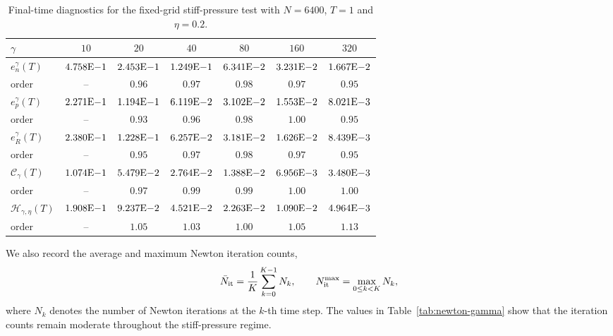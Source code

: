 \documentclass[11pt]{article}
\theoremstyle{plain}
\numberwithin{equation}{section}
\begin{document}
\begin{table}[!htbp]
\centering
\caption{Final-time diagnostics for the fixed-grid stiff-pressure test with
\(N=6400\), \(T=1\) and \(\eta=0.2\). }
\label{tab:stiff-diagnostics}
\begingroup
\small
\renewcommand{\arraystretch}{1.08}
\setlength{\tabcolsep}{5pt}
\begin{tabular}{lcccccc}
\toprule
\(\gamma\) & \(10\) & \(20\) & \(40\) & \(80\) & \(160\) & \(320\) \\
\midrule
\(e_n^\gamma(T)\)
& \(4.758{\rm E}{-1}\) & \(2.453{\rm E}{-1}\) & \(1.249{\rm E}{-1}\)
& \(6.341{\rm E}{-2}\) & \(3.231{\rm E}{-2}\) & \(1.667{\rm E}{-2}\) \\
 order
& -- & \(0.96\) & \(0.97\) & \(0.98\) & \(0.97\) & \(0.95\) \\
\hline
\(e_p^\gamma(T)\)
& \(2.271{\rm E}{-1}\) & \(1.194{\rm E}{-1}\) & \(6.119{\rm E}{-2}\)
& \(3.102{\rm E}{-2}\) & \(1.553{\rm E}{-2}\) & \(8.021{\rm E}{-3}\) \\
 order
& -- & \(0.93\) & \(0.96\) & \(0.98\) & \(1.00\) & \(0.95\) \\
\hline
\(e_R^\gamma(T)\)
& \(2.380{\rm E}{-1}\) & \(1.228{\rm E}{-1}\) & \(6.257{\rm E}{-2}\)
& \(3.181{\rm E}{-2}\) & \(1.626{\rm E}{-2}\) & \(8.439{\rm E}{-3}\) \\
 order
& -- & \(0.95\) & \(0.97\) & \(0.98\) & \(0.97\) & \(0.95\) \\
\hline
\(\mathcal C_\gamma(T)\)
& \(1.074{\rm E}{-1}\) & \(5.479{\rm E}{-2}\) & \(2.764{\rm E}{-2}\)
& \(1.388{\rm E}{-2}\) & \(6.956{\rm E}{-3}\) & \(3.480{\rm E}{-3}\) \\
 order
& -- & \(0.97\) & \(0.99\) & \(0.99\) & \(1.00\) & \(1.00\) \\
\hline
\(\mathcal H_{\gamma,\eta}(T)\)
& \(1.908{\rm E}{-1}\) & \(9.237{\rm E}{-2}\) & \(4.521{\rm E}{-2}\)
& \(2.263{\rm E}{-2}\) & \(1.090{\rm E}{-2}\) & \(4.964{\rm E}{-3}\) \\
 order
& -- & \(1.05\) & \(1.03\) & \(1.00\) & \(1.05\) & \(1.13\) \\
\bottomrule
\end{tabular}
\endgroup
\end{table}


We also record the average and maximum Newton iteration counts,
\[
\bar N_{\rm it}
=
\frac{1}{K}\sum_{k=0}^{K-1}N_k,
\qquad
N_{\rm it}^{\max}
=
\max_{0\le k<K}N_k,
\]
where \(N_k\) denotes the number of Newton iterations at the \(k\)-th time
step. The values in Table~\ref{tab:newton-gamma} show that the iteration counts remain moderate
throughout the stiff-pressure regime.
\end{document}
